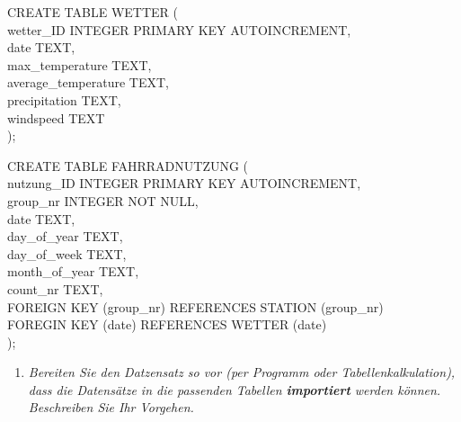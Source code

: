 \documentclass{article}
\begin{document}
CREATE TABLE WETTER ( \\ \indent
\hspace{1cm} wetter\_ID INTEGER PRIMARY KEY AUTOINCREMENT, \\ \indent
\hspace{1cm} date TEXT, \\ \indent
\hspace{1cm} max\_temperature TEXT, \\ \indent
\hspace{1cm} average\_temperature TEXT, \\ \indent
\hspace{1cm} precipitation TEXT, \\ \indent
\hspace{1cm} windspeed TEXT \\ \indent
); \\ \indent

\newpage

CREATE TABLE FAHRRADNUTZUNG ( \\ \indent
\hspace{1cm}nutzung\_ID INTEGER PRIMARY KEY AUTOINCREMENT, \\ \indent
\hspace{1cm}group\_nr INTEGER NOT NULL, \\ \indent
\hspace{1cm}date TEXT, \\ \indent
\hspace{1cm}day\_of\_year TEXT, \\ \indent
\hspace{1cm}day\_of\_week TEXT, \\ \indent
\hspace{1cm}month\_of\_year TEXT, \\ \indent
\hspace{1cm}count\_nr TEXT, \\ \indent
\hspace{1cm}FOREIGN KEY (group\_nr) REFERENCES STATION (group\_nr)\\ \indent
\hspace{1cm}FOREGIN KEY (date) REFERENCES WETTER (date)\\ \indent
);
 

    
\begin{enumerate}[resume]
    \item \textit{Bereiten Sie den Datzensatz so vor (per Programm oder Tabellenkalkulation), dass die Datensätze in die passenden Tabellen \textbf{importiert} werden können. Beschreiben Sie Ihr Vorgehen.}
    \end{enumerate} 
    
\end{document}
